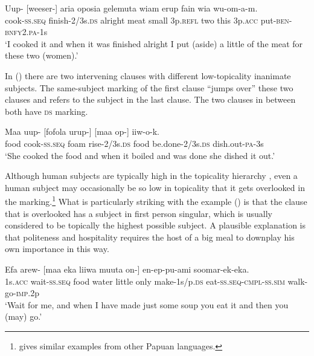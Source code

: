 \ea%
\label{ex:x1483}
\gll Uup-  [weeser-]  aria  oposia  gelemuta  wiam  erup fain  wia  wu-om-a-m.\\
cook-\textsc{ss}.\textsc{seq} finish-2/3s.\textsc{ds} alright  meat  small  3p.\textsc{refl} two this 3p.\textsc{acc} put-\textsc{ben}-\textsc{bnfy}2.\textsc{pa}-1s     \\
\glt`I cooked it and when it was finished alright I put (aside) a little of the meat for these two (women).'
\z


In () there are two intervening clauses with different low-topicality inanimate subjects. The same-subject marking of the first clause ``jumps over'' these two clauses and refers to the subject in the last clause. The two clauses in between both have \textsc{ds} marking. 

\ea%
\label{ex:x1476}
\gll Maa  uup- \textstyleEmphasizedVernacularWords{} [fofola  urup-]  [maa  op-] iiw-o-k.\\
food  cook-\textsc{ss}.\textsc{seq} foam rise-2/3s.\textsc{ds} food  be.done-2/3s.\textsc{ds} dish.out-\textsc{pa}-3s\hspace{-1mm}\\
\glt`She cooked the food and when it boiled and was done she dished it out.'
\z


Although human subjects are typically high in the topicality hierarchy \citep[364]{Givon1984}, even a human subject may occasionally be so low in topicality that it gets overlooked in the  marking.\footnote{\citet[236--237]{Reesink1983a} gives similar examples from other Papuan languages.} What is particularly striking with the example () is that the clause that is overlooked has a subject in first person singular, which is usually considered to be topically the highest possible subject. A plausible explanation is that politeness and hospitality requires the host of a big meal to downplay his own importance in this way. 

\ea%
\label{ex:x1477}
\gll Efa  arew-  [maa  eka  liiwa  muuta  on-] en-ep-pu-ami  soomar-ek-eka. \\
1s.\textsc{acc}  wait-\textsc{ss}.\textsc{seq} food water little only make-1s/p.\textsc{ds} eat-\textsc{ss}.\textsc{seq}-\textsc{cmpl}-\textsc{ss}.\textsc{sim} walk-go-\textsc{imp}.2p\\
\glt`Wait for me, and when I have made just some soup you eat it and then you (may) go.'
\z


